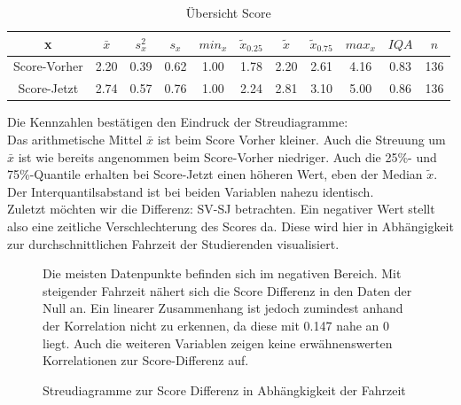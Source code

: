\documentclass[11pt, a4paper]{article}
\begin{document}
\begin{table}[h]
	\vspace{0.2cm}
	\centering
	\begin{tabular}{c|ccccccccc|c}
		x & $\bar{x}$ & $s_x^2$ & $s_x$ & $min_x$ & $\tilde{x}_{0.25}$ & $\tilde{x}$ & $\tilde{x}_{0.75}$ & $max_x$ & $IQA$ & $n$ \\ \hline
		Score-Vorher & 2.20 & 0.39 & 0.62 & 1.00 & 1.78 & 2.20 & 2.61 & 4.16 & 0.83 & 136 \\
		Score-Jetzt & 2.74 & 0.57 & 0.76 & 1.00 & 2.24 & 2.81 & 3.10 & 5.00 & 0.86 & 136
	\end{tabular}
	\caption{Übersicht Score}
\end{table}
	Die Kennzahlen bestätigen den Eindruck der Streudiagramme:\\
Das arithmetische Mittel $\bar{x}$ ist beim Score Vorher kleiner.
Auch die Streuung um $\bar{x}$ ist wie bereits angenommen beim Score-Vorher niedriger. Auch die 25\%- und 75\%-Quantile erhalten bei Score-Jetzt einen höheren Wert, eben der Median $\tilde{x}$.
Der Interquantilsabstand ist bei beiden Variablen nahezu identisch. \\
	Zuletzt möchten wir die Differenz: SV-SJ betrachten. Ein negativer Wert stellt also eine zeitliche Verschlechterung des Scores da.
Diese wird hier in Abhängigkeit zur durchschnittlichen Fahrzeit der Studierenden visualisiert.
\begin{figure}[h]
	{\centering 
		\vspace{-0.5cm}
		\caption{ Streudiagramme zur Score Differenz in Abhängkigkeit der Fahrzeit }}
		\vspace{1cm}
		\raggedright
		
		Die meisten Datenpunkte befinden sich im negativen Bereich. Mit steigender Fahrzeit nähert sich die Score Differenz in den Daten der Null an. 
		Ein linearer Zusammenhang ist jedoch zumindest anhand der Korrelation nicht zu erkennen, da diese mit 0.147 nahe an 0 liegt. 
		Auch die weiteren Variablen zeigen keine erwähnenswerten Korrelationen zur Score-Differenz auf. 
		
		
\end{figure}



\leavevmode
\newpage
\end{document}
